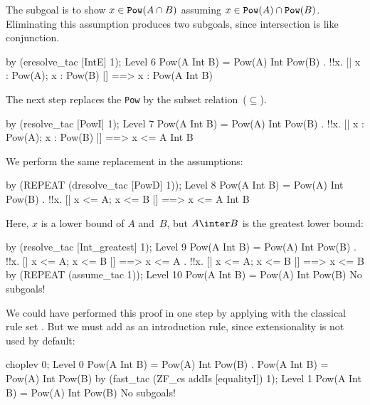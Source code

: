 The subgoal is to show $x\in {\tt Pow}(A\cap B)$ assuming $x\in{\tt
Pow}(A)\cap {\tt Pow}(B)$.  Eliminating this assumption produces two
subgoals, since intersection is like conjunction.
\begin{ttbox}
by (eresolve_tac [IntE] 1);
{\out Level 6}
{\out Pow(A Int B) = Pow(A) Int Pow(B)}
{. !!x. [| x : Pow(A); x : Pow(B) |] ==> x : Pow(A Int B)}
\end{ttbox}
The next step replaces the {\tt Pow} by the subset
relation~($\subseteq$).
\begin{ttbox}
by (resolve_tac [PowI] 1);
{\out Level 7}
{\out Pow(A Int B) = Pow(A) Int Pow(B)}
{. !!x. [| x : Pow(A); x : Pow(B) |] ==> x <= A Int B}
\end{ttbox}
We perform the same replacement in the assumptions:
\begin{ttbox}
by (REPEAT (dresolve_tac [PowD] 1));
{\out Level 8}
{\out Pow(A Int B) = Pow(A) Int Pow(B)}
{. !!x. [| x <= A; x <= B |] ==> x <= A Int B}
\end{ttbox}
Here, $x$ is a lower bound of $A$ and~$B$, but $A\inter B$ is the greatest
lower bound:
\begin{ttbox}
by (resolve_tac [Int_greatest] 1);
{\out Level 9}
{\out Pow(A Int B) = Pow(A) Int Pow(B)}
{. !!x. [| x <= A; x <= B |] ==> x <= A}
{. !!x. [| x <= A; x <= B |] ==> x <= B}
by (REPEAT (assume_tac 1));
{\out Level 10}
{\out Pow(A Int B) = Pow(A) Int Pow(B)}
{\out No subgoals!}
\end{ttbox}
We could have performed this proof in one step by applying
 with the classical rule set .  But we
must add  as an introduction rule, since extensionality
is not used by default:
\begin{ttbox}
choplev 0;
{\out Level 0}
{\out Pow(A Int B) = Pow(A) Int Pow(B)}
{. Pow(A Int B) = Pow(A) Int Pow(B)}
by (fast_tac (ZF_cs addIs [equalityI]) 1);
{\out Level 1}
{\out Pow(A Int B) = Pow(A) Int Pow(B)}
{\out No subgoals!}
\end{ttbox}


